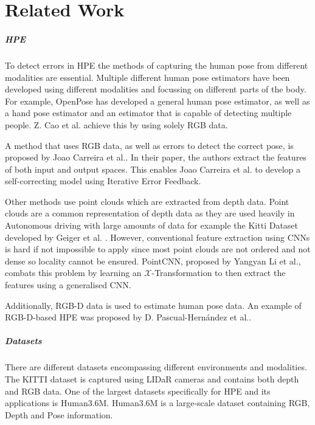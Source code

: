 \chapter{Related Work}
\label{sec:related_work}

\paragraph{HPE}

To detect errors in HPE the methods of capturing the human pose from different modalities are essential. Multiple different human pose estimators have been developed using different modalities and focussing on different parts of the body. For example, OpenPose has developed a general human pose estimator\cite{OpenPosePose}, as well as a hand pose estimator\cite{OpenPoseHand} and an estimator that is capable of detecting multiple people\cite{OpenPoseMulti}. Z. Cao et al. achieve this by using solely RGB data.

A method that uses RGB data, as well as errors to detect the correct pose, is proposed by Joao Carreira et al.\cite{IterativeErrorFeedback}. In their paper, the authors extract the features of both input and output spaces. This enables Joao Carreira et al. to develop a self-correcting model using Iterative Error Feedback.

Other methods use point clouds which are extracted from depth data. Point clouds are a common representation of depth data as they are used heavily in Autonomous driving with large amounts of data for example the Kitti Dataset developed by Geiger et al. \cite{Geiger2012CVPR}. However, conventional feature extraction using CNNs is hard if not impossible to apply since most point clouds are not ordered and not dense so locality cannot be ensured. PointCNN, proposed by Yangyan Li et al.\cite{li2018pointcnn}, combats this problem by learning an $\mathcal{X}$-Transformation to then extract the features using a generalised CNN.

Additionally, RGB-D data is used to estimate human pose data. An example of RGB-D-based HPE was proposed by D. Pascual-Hernández et al.\cite{PASCUALHERNANDEZ2022102225}.

\paragraph{Datasets}

There are different datasets encompassing different environments and modalities. The KITTI dataset is captured using LIDaR cameras and contains both depth and RGB data\cite{Geiger2012CVPR}. One of the largest datasets specifically for HPE and its applications is Human3.6M\cite{h36m_pami}. Human3.6M is a large-scale dataset containing RGB, Depth and Pose information.

